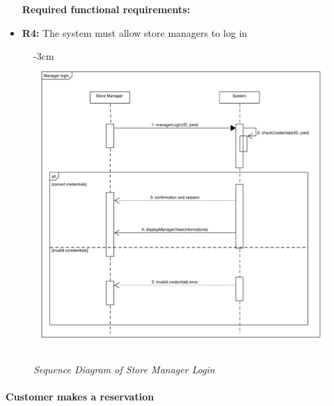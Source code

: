 \documentclass{article}
\begin{document}
\begin{center}
					\begin{itemize}
					\bigskip
					\bigskip
					\bigskip
					 {\bfseries Required functional requirements: }
					\item {\bfseries R4: } The system must allow store managers to log in
					

					\end{itemize}

							\begin{figure}
								\begin{adjustwidth} {-3cm}{}
									\centering
									\includegraphics[scale=0.7]{SD/4_managerLogin.pdf}\\
									\caption{\emph{Sequence Diagram of Store Manager Login}}
								\end{adjustwidth}
							\end{figure}
					
				\end{center}
				\newpage
			
			\paragraph{Customer makes a reservation}
			
\end{document}
